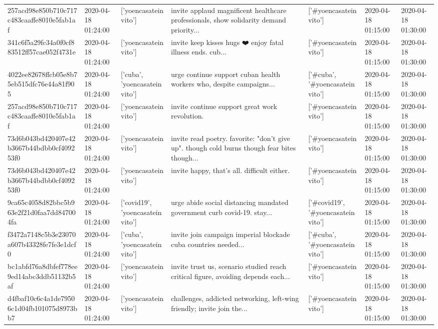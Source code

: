 \begin{tabular}{lllllll}
257acd98e850b710c717c483caaffe8010e5fab1af & 2020-04-18 01:24:00 & ['yoencasateinvito'] & invite applaud magnificent healthcare professionals, show solidarity demand priority... & ['#yoencasateinvito'] & 2020-04-18 01:15:00 & 2020-04-18 01:30:00 \\
341c6f5a29fc34a0f0cf883512ff57cae052f4731e & 2020-04-18 01:24:00 & ['yoencasateinvito'] & invite keep kisses hugs ❤️ enjoy fatal illness ends. cub... & ['#yoencasateinvito'] & 2020-04-18 01:15:00 & 2020-04-18 01:30:00 \\
4022ee82678ffcb05e8b75eb515dfc76e44a81f905 & 2020-04-18 01:24:00 & ['cuba', 'yoencasateinvito'] & urge continue support cuban health workers who, despite campaigns... & ['#cuba', '#yoencasateinvito'] & 2020-04-18 01:15:00 & 2020-04-18 01:30:00 \\
257acd98e850b710c717c483caaffe8010e5fab1af & 2020-04-18 01:24:00 & ['yoencasateinvito'] & invite continue support great work revolution. & ['#yoencasateinvito'] & 2020-04-18 01:15:00 & 2020-04-18 01:30:00 \\
73d6b043bd420407e42b3667b44bdbb0cf409253f0 & 2020-04-18 01:24:00 & ['yoencasateinvito'] & invite read poetry. favorite: "don't give up". though cold burns though fear bites though... & ['#yoencasateinvito'] & 2020-04-18 01:15:00 & 2020-04-18 01:30:00 \\
73d6b043bd420407e42b3667b44bdbb0cf409253f0 & 2020-04-18 01:24:00 & ['yoencasateinvito'] & invite happy, that's all. difficult either. & ['#yoencasateinvito'] & 2020-04-18 01:15:00 & 2020-04-18 01:30:00 \\
9ca65c4058d82bbc5b963e2f21d0faa7dd847004fa & 2020-04-18 01:24:00 & ['covid19', 'yoencasateinvito'] & urge abide social distancing mandated government curb covid-19. stay... & ['#covid19', '#yoencasateinvito'] & 2020-04-18 01:15:00 & 2020-04-18 01:30:00 \\
f3472a7148c5b3e23070a607b43328fe7fe3e1dcf0 & 2020-04-18 01:24:00 & ['cuba', 'yoencasateinvito'] & invite join campaign imperial blockade cuba countries needed... & ['#cuba', '#yoencasateinvito'] & 2020-04-18 01:15:00 & 2020-04-18 01:30:00 \\
bc1abfd76a8dbfef778ee9ed14abc3ddb51132b5af & 2020-04-18 01:24:00 & ['yoencasateinvito'] & invite trust us, scenario studied reach critical figure, avoiding depends each... & ['#yoencasateinvito'] & 2020-04-18 01:15:00 & 2020-04-18 01:30:00 \\
d4fbaf10c6c4a1de79506c1d04fb101075d8973bb7 & 2020-04-18 01:24:00 & ['yoencasateinvito'] & challenges, addicted networking, left-wing friendly; invite join the... & ['#yoencasateinvito'] & 2020-04-18 01:15:00 & 2020-04-18 01:30:00 \\

\end{tabular}
